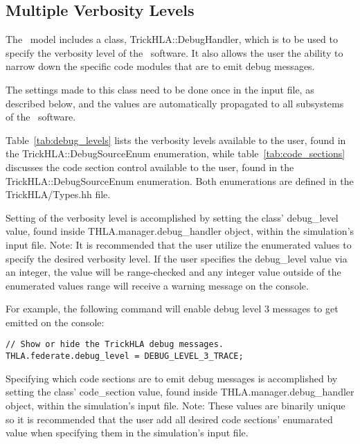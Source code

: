 \subsection{Multiple Verbosity Levels}

The \TrickHLA\ model includes a class, {\ttfamily TrickHLA::DebugHandler},
which is to be used to specify the verbosity level of the \TrickHLA\ software.
It also allows the user the ability to narrow down the specific code modules
that are to emit debug messages.

The settings made to this class need to be done once in the input file, as
described below, and the values are automatically propagated to all subsystems
of the \TrickHLA\ software.

Table~\ref{tab:debug_levels} lists the verbosity levels available to the user,
found in the {\ttfamily TrickHLA::DebugSourceEnum} enumeration, while
table~\ref{tab:code_sections} discusses the code
section control available to the user, found in the {\ttfamily TrickHLA::DebugSourceEnum}
enumeration. Both enumerations are defined in the {\ttfamily TrickHLA/Types.hh}
file.

Setting of the verbosity level is accomplished by setting the class' 
{\ttfamily debug\_level} value, found inside
{\ttfamily THLA.manager.debug\_handler} object, within the simulation's input
file. Note: It is recommended that the user utilize the enumerated values to
specify the desired verbosity level. If the user specifies the
{\ttfamily debug\_level} value via an integer, the value will be range-checked
and any integer value outside of the enumerated values range will receive a
warning message on the console.

For example, the following command will enable debug level 3 messages to get
emitted on the console:

\begin{verbatim}
// Show or hide the TrickHLA debug messages.
THLA.federate.debug_level = DEBUG_LEVEL_3_TRACE;
\end{verbatim}


Specifying which code sections are to emit debug messages is accomplished by
setting the class' {\ttfamily code\_section} value, found inside
{\ttfamily THLA.manager.debug\_handler} object, within the simulation's input
file. Note: These values are binarily unique so it is recommended that the user
add all desired code sections' enumarated value when specifying them in the
simulation's input file.

